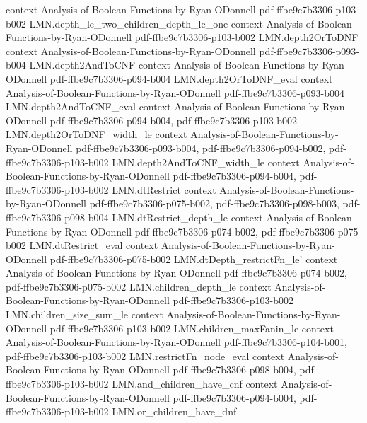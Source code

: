 \begin{lemma}
  {context}
  {Analysis-of-Boolean-Functions-by-Ryan-ODonnell}
  {pdf-ffbe9c7b3306-p103-b002}
\proofstep
  {LMN.depth_le_two_children_depth_le_one}
  {context}
  {Analysis-of-Boolean-Functions-by-Ryan-ODonnell}
  {pdf-ffbe9c7b3306-p103-b002}
\proofstep
  {LMN.depth2OrToDNF}
  {context}
  {Analysis-of-Boolean-Functions-by-Ryan-ODonnell}
  {pdf-ffbe9c7b3306-p093-b004}
\proofstep
  {LMN.depth2AndToCNF}
  {context}
  {Analysis-of-Boolean-Functions-by-Ryan-ODonnell}
  {pdf-ffbe9c7b3306-p094-b004}
\proofstep
  {LMN.depth2OrToDNF_eval}
  {context}
  {Analysis-of-Boolean-Functions-by-Ryan-ODonnell}
  {pdf-ffbe9c7b3306-p093-b004}
\proofstep
  {LMN.depth2AndToCNF_eval}
  {context}
  {Analysis-of-Boolean-Functions-by-Ryan-ODonnell}
  {pdf-ffbe9c7b3306-p094-b004,
    pdf-ffbe9c7b3306-p103-b002}
\proofstep
  {LMN.depth2OrToDNF_width_le}
  {context}
  {Analysis-of-Boolean-Functions-by-Ryan-ODonnell}
  {pdf-ffbe9c7b3306-p093-b004,
    pdf-ffbe9c7b3306-p094-b002,
    pdf-ffbe9c7b3306-p103-b002}
\proofstep
  {LMN.depth2AndToCNF_width_le}
  {context}
  {Analysis-of-Boolean-Functions-by-Ryan-ODonnell}
  {pdf-ffbe9c7b3306-p094-b004,
    pdf-ffbe9c7b3306-p103-b002}
\proofstep
  {LMN.dtRestrict}
  {context}
  {Analysis-of-Boolean-Functions-by-Ryan-ODonnell}
  {pdf-ffbe9c7b3306-p075-b002,
    pdf-ffbe9c7b3306-p098-b003,
    pdf-ffbe9c7b3306-p098-b004}
\proofstep
  {LMN.dtRestrict_depth_le}
  {context}
  {Analysis-of-Boolean-Functions-by-Ryan-ODonnell}
  {pdf-ffbe9c7b3306-p074-b002,
    pdf-ffbe9c7b3306-p075-b002}
\proofstep
  {LMN.dtRestrict_eval}
  {context}
  {Analysis-of-Boolean-Functions-by-Ryan-ODonnell}
  {pdf-ffbe9c7b3306-p075-b002}
\proofstep
  {LMN.dtDepth_restrictFn_le'}
  {context}
  {Analysis-of-Boolean-Functions-by-Ryan-ODonnell}
  {pdf-ffbe9c7b3306-p074-b002,
    pdf-ffbe9c7b3306-p075-b002}
\proofstep
  {LMN.children_depth_le}
  {context}
  {Analysis-of-Boolean-Functions-by-Ryan-ODonnell}
  {pdf-ffbe9c7b3306-p103-b002}
\proofstep
  {LMN.children_size_sum_le}
  {context}
  {Analysis-of-Boolean-Functions-by-Ryan-ODonnell}
  {pdf-ffbe9c7b3306-p103-b002}
\proofstep
  {LMN.children_maxFanin_le}
  {context}
  {Analysis-of-Boolean-Functions-by-Ryan-ODonnell}
  {pdf-ffbe9c7b3306-p104-b001,
    pdf-ffbe9c7b3306-p103-b002}
\proofstep
  {LMN.restrictFn_node_eval}
  {context}
  {Analysis-of-Boolean-Functions-by-Ryan-ODonnell}
  {pdf-ffbe9c7b3306-p098-b004,
    pdf-ffbe9c7b3306-p103-b002}
\proofstep
  {LMN.and_children_have_cnf}
  {context}
  {Analysis-of-Boolean-Functions-by-Ryan-ODonnell}
  {pdf-ffbe9c7b3306-p094-b004,
    pdf-ffbe9c7b3306-p103-b002}
\proofstep
  {LMN.or_children_have_dnf}

\end{lemma}
